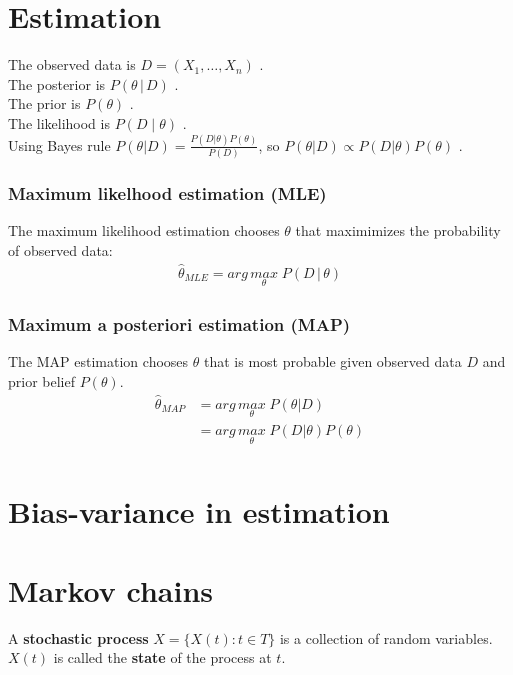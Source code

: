\documentclass[../main.tex]{subfiles}
\begin{document}
\section{Estimation}
The observed data is $D = (X_1, \dots, X_n)$ . \\
The posterior is $P(\theta\, | \, D)$ . \\
The prior is $P(\theta)$ . \\
The likelihood is $P(D\; |\; \theta)$ . \\
Using Bayes rule $P(\theta | D) = \frac{P(D|\theta)P(\theta)}{P(D)}$,
so $P(\theta | D) \propto P(D|\theta)P(\theta)$ .

\subsubsection{Maximum likelhood estimation (MLE)}
The maximum likelihood estimation chooses $\theta$ that maximimizes the probability of observed data:
\begin{align*}
    \hat{\theta}_{MLE} = arg\,\underset{\theta}{max}\; P(D\,|\, \theta)
\end{align*}

\subsubsection{Maximum a posteriori estimation (MAP)}
The MAP estimation chooses $\theta$ that is most probable given observed data $D$ and prior belief
$P(\theta)$. \\

\begin{align*}
    \hat{\theta}_{MAP} & = arg\,\underset{\theta}{max}\; P(\theta | D) \\
                       & = arg\,\underset{\theta}{max}\; P(D | \theta) P(\theta) \\
\end{align*}

\section{Bias-variance in estimation}

\section{Markov chains}

A \textbf{stochastic process} $X = \{X(t): t \in T\}$ is a collection of random variables. $X(t)$ is
called the \textbf{state} of the process at $t$. \\
\end{document}
